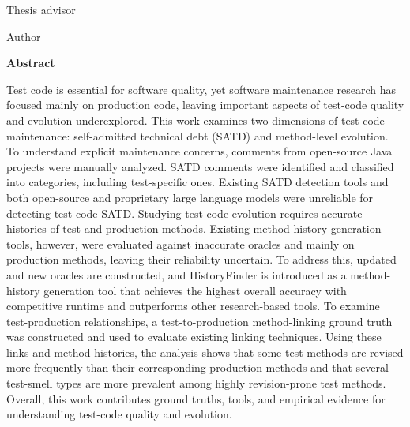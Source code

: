 \clearpage
{}
{}
\thispagestyle{plain}

\vspace*{0.2cm}

\begingroup
\singlespacing
\noindent
\begin{minipage}[t]{0.45\textwidth}
\raggedright
{\small Thesis advisor\par}
\vspace{0.12cm}
{\normalsize\bfseries \AdvisorName\par}
\end{minipage}
\hfill
\begin{minipage}[t]{0.45\textwidth}
\raggedleft
{\small Author\par}
\vspace{0.12cm}
{\normalsize\bfseries \AuthorName\par}
\end{minipage}
\endgroup

\vspace{0.6cm}

\begin{center}
\begingroup
\singlespacing
{\normalsize\bfseries \ThesisTitle\par}
\vspace{0.45cm}
{\normalsize\bfseries Abstract}
\endgroup
\end{center}

\vspace{0.35cm}

Test code is essential for software quality, yet software maintenance research has focused mainly on production code, leaving important aspects of test-code quality and evolution underexplored. This work examines two dimensions of test-code maintenance: self-admitted technical debt (SATD) and method-level evolution.
To understand explicit maintenance concerns, comments from open-source Java projects were manually analyzed. SATD comments were identified and classified into categories, including test-specific ones. Existing SATD detection tools and both open-source and proprietary large language models were unreliable for detecting test-code SATD.
Studying test-code evolution requires accurate histories of test and production methods. Existing method-history generation tools, however, were evaluated against inaccurate oracles and mainly on production methods, leaving their reliability uncertain. To address this, updated and new oracles are constructed, and HistoryFinder is introduced as a method-history generation tool that achieves the highest overall accuracy with competitive runtime and outperforms other research-based tools. To examine test-production relationships, a test-to-production method-linking ground truth was constructed and used to evaluate existing linking techniques. Using these links and method histories, the analysis shows that some test methods are revised more frequently than their corresponding production methods and that several test-smell types are more prevalent among highly revision-prone test methods.
Overall, this work contributes ground truths, tools, and empirical evidence for understanding test-code quality and evolution.
